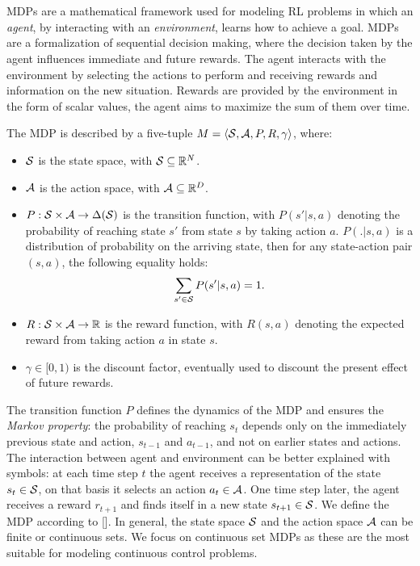 \section{}\label{sec:mdp}
\ac{MDPs} are a mathematical framework used for modeling \ac{RL} problems in which an \emph{agent}, by interacting with an \emph{environment}, learns how to achieve a goal. \ac{MDPs} are a formalization of sequential decision making, where the decision taken by the agent influences immediate and future rewards. The agent interacts with the environment by selecting the actions to perform and receiving rewards and information on the new situation. Rewards are provided by the environment in the form of scalar values, the agent aims to maximize the sum of them over time.
\begin{definition}[MDP]\label{def:mdp}
The \ac{MDP} is described by a five-tuple $M=\langle \mathcal{S}, \mathcal{A}, P, R, \gamma \rangle$, where:
\begin{itemize}
	\item $\mathcal{S}$ is the state space, with $\mathcal{S}\subseteq\mathbb{R}^N$.
	\item $\mathcal{A}$ is the action space, with $\mathcal{A}\subseteq\mathbb{R}^D$.
	\item $P: \mathcal{S} \times \mathcal{A} \to \Delta(\mathcal{S})$ is the transition function, with $P(s'|s,a)$ denoting the probability of reaching state $s'$ from state $s$ by taking action $a$. $P(.|s,a)$ is a distribution of probability on the arriving state, then for any state-action pair $(s,a)$, the following equality holds:
	\begin{align} \sum_{s' \in \mathcal{S}} P(s'|s,a) = 1. \end{align}
	\item $R: \mathcal{S} \times \mathcal{A} \to \mathbb{R}$ is the reward function, with $R(s,a)$ denoting the expected reward from taking action $a$ in state $s$.
	\item $\gamma \in [0, 1)$ is the discount factor, eventually used to discount the present effect of future rewards.
\end{itemize}
\end{definition}
\noindent The transition function $P$ defines the dynamics of the \ac{MDP} and ensures the \emph{Markov property}: the probability of reaching $s_t$ depends only on the immediately previous state and action, $s_{t-1}$ and $a_{t-1}$, and not on earlier states and actions.\\
\newline
The interaction between agent and environment can be better explained with symbols: at each time step $t$ the agent receives a representation of the state $s_t \in \mathcal{S}$, on that basis it selects an action $a_t \in \mathcal{A}$. One time step later, the agent receives a reward $r_{t+1}$ and finds itself in a new state $s_{t+1} \in \mathcal{S}$. We define the \ac{MDP} according to [\cite{puterman2014markov}]. In general, the state space $\mathcal{S}$ and the action space $\mathcal{A}$ can be finite or continuous sets. We focus on continuous set \ac{MDPs} as these are the most suitable for modeling continuous control problems.
